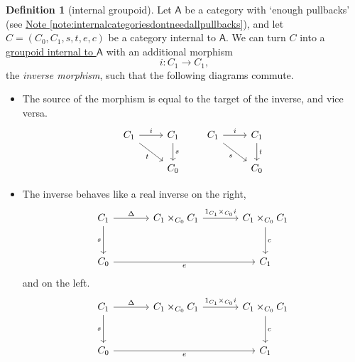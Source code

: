 \documentclass[a4paper,10pt]{scrreprt}
\newcommand{\defn}[1]{\ul{#1}}
\theoremstyle{definition}
\newtheorem{definition}{Definition}[section]
\theoremstyle{plain}
\theoremstyle{remark}
\begin{document}
\begin{definition}[internal groupoid]
  \label{def:internalgroupoid}
  Let $\mathsf{A}$ be a category with `enough pullbacks' (see \hyperref[note:internalcategoriesdontneedallpullbacks]{Note \ref*{note:internalcategoriesdontneedallpullbacks}}), and let $C = (C_{0}, C_{1}, s, t, e, c)$ be a category internal to $\mathsf{A}$. We can turn $C$ into a \defn{groupoid internal to $\mathsf{A}$} with an additional morphism
  \begin{equation*}
    i\colon C_{1} \to C_{1},
  \end{equation*}
  the \emph{inverse morphism}, such that the following diagrams commute.
  \begin{itemize}
    \item The source of the morphism is equal to the target of the inverse, and vice versa.
      \begin{equation*}
        \begin{tikzcd}
          C_{1}
          \arrow[r, "i"]
          \arrow[rd, swap, "t"]
          & C_{1}
          \arrow[d, "s"]
          \\ 
          & C_{0}
        \end{tikzcd}
        \qquad
        \begin{tikzcd}
          C_{1}
          \arrow[r, "i"]
          \arrow[rd, swap, "s"]
          & C_{1}
          \arrow[d, "t"]
          \\ 
          & C_{0}
        \end{tikzcd}
      \end{equation*}

    \item The inverse behaves like a real inverse on the right,
      \begin{equation*}
        \begin{tikzcd}[column sep=large, row sep=large]
          C_{1}
          \arrow[r, "\Delta"]
          \arrow[d, swap, "s"]
          & C_{1} \times_{C_{0}} C_{1}
          \arrow[r, "1_{C_{1}} \times_{C_{0}} i"]
          & C_{1} \times_{C_{0}} C_{1}
          \arrow[d, "c"]
          \\
          C_{0}
          \arrow[rr, swap, "e"]
          & & C_{1}
        \end{tikzcd}
      \end{equation*}
      and on the left.
      \begin{equation*}
        \begin{tikzcd}[column sep=large, row sep=large]
          C_{1}
          \arrow[r, "\Delta"]
          \arrow[d, swap, "s"]
          & C_{1} \times_{C_{0}} C_{1}
          \arrow[r, "1_{C_{1}} \times_{C_{0}} i"]
          & C_{1} \times_{C_{0}} C_{1}
          \arrow[d, "c"]
          \\
          C_{0}
          \arrow[rr, swap, "e"]
          & & C_{1}
        \end{tikzcd}
      \end{equation*}
  \end{itemize}
\end{definition}
\end{document}
